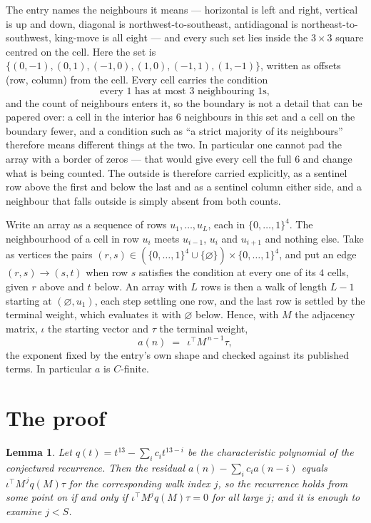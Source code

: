 \documentclass[11pt,a4paper]{article}
\theoremstyle{plain}
\newtheorem{lemma}[theorem]{Lemma}
\theoremstyle{definition}
\begin{document}
The entry names the neighbours it means --- horizontal is left and right, vertical is up and
down, diagonal is northwest-to-southeast, antidiagonal is northeast-to-southwest, king-move is
all eight --- and every such set lies inside the $3\times3$ square centred on the cell. Here
the set is $\{(0,-1), (0,1), (-1,0), (1,0), (-1,1), (1,-1)\}$, written as offsets (row, column) from the cell. Every cell carries
the condition
\[
\text{every 1 has at most 3 neighbouring 1s},
\]
and the count of neighbours enters it, so the boundary is not a detail that can be papered
over: a cell in the interior has $6$ neighbours in this set and a cell on the boundary
fewer, and a condition such as ``a strict majority of its neighbours'' therefore means
different things at the two. In particular one cannot pad the array with a border of zeros ---
that would give every cell the full $6$ and change what is being counted. The outside is
therefore carried
explicitly, as a sentinel row above the first and below the last and as a sentinel column
either side, and a neighbour that falls outside is simply absent from both counts.

Write an array as a sequence of rows $u_1,\dots,u_L$, each in
$\{0,\dots,1\}^{4}$. The neighbourhood of a cell in row $u_i$ meets $u_{i-1}$,
$u_i$ and $u_{i+1}$ and nothing else. Take as vertices the pairs
$(r,s)\in(\{0,\dots,1\}^{4}\cup\{\varnothing\})\times\{0,\dots,1\}^{4}$,
and put an edge $(r,s)\to(s,t)$ when row $s$ satisfies the condition at every one of its
$4$ cells, given $r$ above and $t$ below. An array with $L$ rows is then a walk of length
$L-1$ starting at $(\varnothing,u_1)$, each step settling one row, and the last row is
settled by the terminal weight, which evaluates it with $\varnothing$ below. Hence,
with $M$ the adjacency matrix, $\iota$ the starting vector and $\tau$ the terminal weight,
\[
a(n)\;=\;\,\iota^{\!\top}M^{\,n-1}\tau ,
\]
the exponent fixed by the entry's own shape and checked against its published terms. In
particular $a$ is $C$-finite.

\section{The proof}

\begin{lemma}\label{lem:crit}
Let $q(t)=t^{13}-\sum_i c_it^{13-i}$ be the characteristic polynomial of the
conjectured recurrence. Then the residual $a(n)-\sum_ic_ia(n-i)$ equals
$\iota^{\!\top}M^{\,j}q(M)\tau$ for the corresponding walk index $j$, so the
recurrence holds from some point on if and only if $\iota^{\!\top}M^{j}q(M)\tau=0$ for all
large $j$; and it is enough to examine $j<S$.
\end{lemma}
\end{document}

